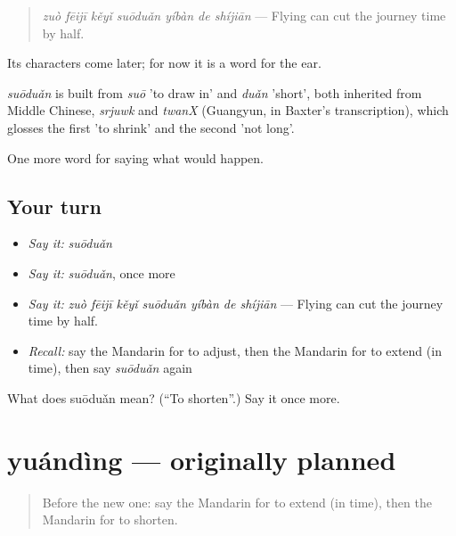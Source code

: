 \begin{quote}
\emph{zuò fēijī kěyǐ suōduǎn yíbàn de shíjiān} — Flying can cut the journey time by half.
\end{quote}

Its characters come later; for now it is a word for the ear.

\begin{cousinweb}
\emph{suōduǎn} is built from \emph{suō} 'to draw in' and \emph{duǎn} 'short', both inherited from Middle Chinese, \emph{srjuwk} and \emph{twanX} (Guangyun, in Baxter's transcription), which glosses the first 'to shrink' and the second 'not long'.
\end{cousinweb}

\begin{grammarlens}[title={What you've built}]
One more word for saying what would happen.
\end{grammarlens}

\subsection*{Your turn}
\begin{itemize}
\raggedright
  \item \emph{Say it:} \emph{suōduǎn}
  \item \emph{Say it:} \emph{suōduǎn}, once more
  \item \emph{Say it:} \emph{zuò fēijī kěyǐ suōduǎn yíbàn de shíjiān} — Flying can cut the journey time by half.
  \item \emph{Recall:} say the Mandarin for to adjust, then the Mandarin for to extend (in time), then say \emph{suōduǎn} again
\end{itemize}

\begin{tcolorbox}[breakable,colback=teal!4,colframe=teal!35!black,title={Before you move on}]
What does suōduǎn mean? (\textquotedblleft{}To shorten\textquotedblright{}.) Say it once more.
\end{tcolorbox}
\section[yuándìng]{yuándìng — originally planned}

\label{lesson:ZH-C400-yuanding}



\begin{quote}
Before the new one: say the Mandarin for to extend (in time), then the Mandarin for to shorten.
\end{quote}

